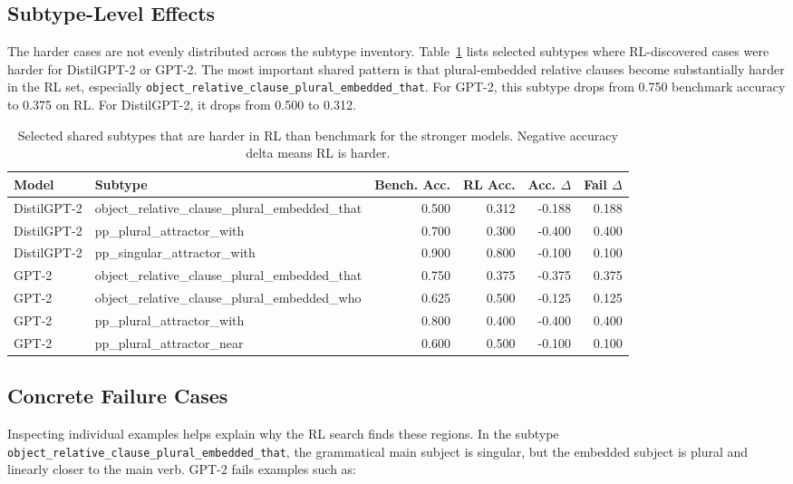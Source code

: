\documentclass[11pt]{article}
\begin{document}
\subsection{Subtype-Level Effects}

The harder cases are not evenly distributed across the subtype inventory.
Table~\ref{tab:subtypes} lists selected subtypes where RL-discovered cases were harder for
DistilGPT-2 or GPT-2. The most important shared pattern is that
plural-embedded relative clauses become substantially harder in the RL set,
especially \texttt{object\_relative\_clause\_plural\_embedded\_that}.
For GPT-2, this subtype drops from 0.750 benchmark accuracy to 0.375 on RL.
For DistilGPT-2, it drops from 0.500 to 0.312.

\begin{table}[t]
\centering
\small
\begin{tabular}{llrrrr}
\toprule
Model & Subtype & Bench. Acc. & RL Acc. & Acc. $\Delta$ & Fail $\Delta$ \\
\midrule
DistilGPT-2 & object\_relative\_clause\_plural\_embedded\_that & 0.500 & 0.312 & -0.188 & 0.188 \\
DistilGPT-2 & pp\_plural\_attractor\_with & 0.700 & 0.300 & -0.400 & 0.400 \\
DistilGPT-2 & pp\_singular\_attractor\_with & 0.900 & 0.800 & -0.100 & 0.100 \\
GPT-2 & object\_relative\_clause\_plural\_embedded\_that & 0.750 & 0.375 & -0.375 & 0.375 \\
GPT-2 & object\_relative\_clause\_plural\_embedded\_who & 0.625 & 0.500 & -0.125 & 0.125 \\
GPT-2 & pp\_plural\_attractor\_with & 0.800 & 0.400 & -0.400 & 0.400 \\
GPT-2 & pp\_plural\_attractor\_near & 0.600 & 0.500 & -0.100 & 0.100 \\
\bottomrule
\end{tabular}
\caption{Selected shared subtypes that are harder in RL than benchmark for
the stronger models. Negative accuracy delta means RL is harder.}
\label{tab:subtypes}
\end{table}

\subsection{Concrete Failure Cases}

Inspecting individual examples helps explain why the RL search finds these
regions. In the subtype
\texttt{object\_relative\_clause\_plural\_embedded\_that}, the grammatical
main subject is singular, but the embedded subject is plural and linearly
closer to the main verb. GPT-2 fails examples such as:
\end{document}
